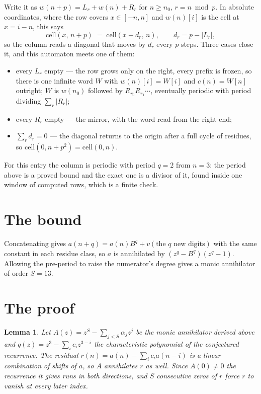 \documentclass[11pt,a4paper]{article}
\theoremstyle{plain}
\newtheorem{lemma}[theorem]{Lemma}
\theoremstyle{definition}
\begin{document}
Write it as $w(n+p)=L_r+w(n)+R_r$ for $n\ge n_0$, $r=n \bmod p$. In absolute coordinates, where
the row covers $x\in[-n,n]$ and $w(n)[i]$ is the cell at $x=i-n$, this says
\[
\mathrm{cell}(x,\,n+p)\;=\;\mathrm{cell}(x+d_r,\,n),\qquad d_r=p-|L_r| ,
\]
so the column reads a diagonal that moves by $d_r$ every $p$ steps. Three cases close it, and
this automaton meets one of them:

\begin{itemize}
\item every $L_r$ empty --- the row grows only on the right, every prefix is frozen, so there
is one infinite word $W$ with $w(n)[i]=W[i]$ and $c(n)=W[n]$ outright; $W$ is $w(n_0)$ followed
by $R_{r_0}R_{r_1}\cdots$, eventually periodic with period dividing $\sum_r|R_r|$;
\item every $R_r$ empty --- the mirror, with the word read from the right end;
\item $\sum_r d_r=0$ --- the diagonal returns to the origin after a full cycle of residues, so
$\mathrm{cell}(0,n+p^2)=\mathrm{cell}(0,n)$.
\end{itemize}

For this entry the column is periodic with period $q=2$ from $n=3$: the period above is a
proved bound and the exact one is a divisor of it, found inside one window of computed rows,
which is a finite check.

\section{The bound}

Concatenating gives $a(n+q)=a(n)B^{q}+v(\text{the }q\text{ new digits})$ with the same constant in each residue class, so $a$ is annihilated by $(z^{q}-B^{q})(z^{q}-1)$.
Allowing the pre-period to raise the numerator's degree gives a monic annihilator of order
$S=13$.

\section{The proof}

\begin{lemma}\label{lem:crit}
Let $A(z)=z^S-\sum_{j<S}\alpha_jz^{j}$ be the monic annihilator derived above and
$q(z)=z^{3}-\sum_ic_iz^{3-i}$ the characteristic polynomial of the conjectured
recurrence. The residual $r(n)=a(n)-\sum_ic_ia(n-i)$ is a linear combination of shifts of $a$,
so $A$ annihilates $r$ as well. Since $A(0)\ne0$ the recurrence it gives runs in both
directions, and $S$ consecutive zeros of $r$ force $r$ to vanish at every later index.
\end{lemma}
\end{document}
